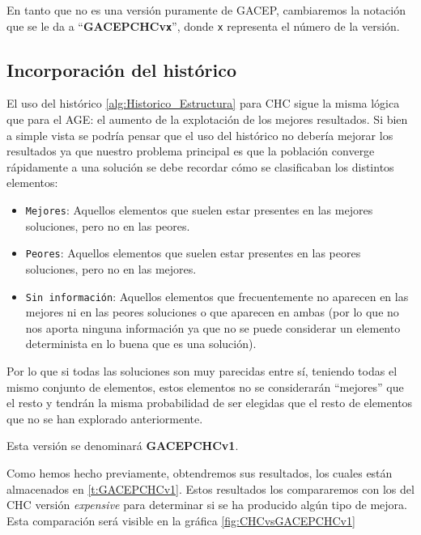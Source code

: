 En tanto que no es una versión puramente de GACEP, cambiaremos la notación que se le da a ``\textbf{GACEPCHCv\texttt{x}}'', donde \texttt{x} representa el número de la versión. 

\subsection{Incorporación del histórico}

El uso del histórico \ref{alg:Historico_Estructura} para CHC sigue la misma lógica que para el AGE: el aumento de la explotación de los mejores resultados. 
Si bien a simple vista se podría pensar que el uso del histórico no debería mejorar los resultados ya que nuestro problema principal es que la población converge rápidamente a una solución se debe recordar cómo se clasificaban los distintos elementos:
\begin{itemize}
	\item \texttt{Mejores}: Aquellos elementos que suelen estar presentes en las mejores soluciones, pero no en las peores.
	\item \texttt{Peores}: Aquellos elementos que suelen estar presentes en las peores soluciones, pero no en las mejores. 
	\item \texttt{Sin información}: Aquellos elementos que frecuentemente no aparecen en las mejores ni en las peores soluciones o que aparecen en ambas (por lo que no nos aporta ninguna información ya que no se puede considerar un elemento determinista en lo buena que es una solución).
\end{itemize}
Por lo que si todas las soluciones son muy parecidas entre sí, teniendo todas el mismo conjunto de elementos, estos elementos no se considerarán ``mejores'' que el resto y tendrán la misma probabilidad de ser elegidas que el resto de elementos que no se han explorado anteriormente. 

Esta versión se denominará \textbf{GACEPCHCv1}.

Como hemos hecho previamente, obtendremos sus resultados, los cuales están almacenados en \ref{t:GACEPCHCv1}. 
Estos resultados los compararemos con los del CHC versión \textit{expensive} para determinar si se ha producido algún tipo de mejora. 
Esta comparación será visible en la gráfica \ref{fig:CHCvsGACEPCHCv1}

